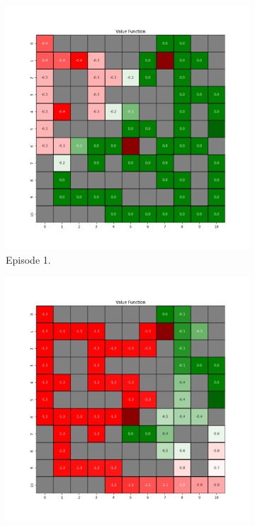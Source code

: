 \documentclass{assignment}
\begin{document}
\begin{figure}[H]
    \begin{subfigure}{0.3\textwidth}
        \includegraphics[width=\textwidth]{figures/value_q/gamma_sweep/value_function_alpha_0.1_gamma_0.25_epsilon_0.2_iteration_1.png}
    \caption{Episode 1.}
    \end{subfigure}\hfill
    \begin{subfigure}{0.3\textwidth}
        \includegraphics[width=\textwidth]{figures/value_q/gamma_sweep/value_function_alpha_0.1_gamma_0.25_epsilon_0.2_iteration_50.png}

\end{subfigure}
\end{figure}
\end{document}
